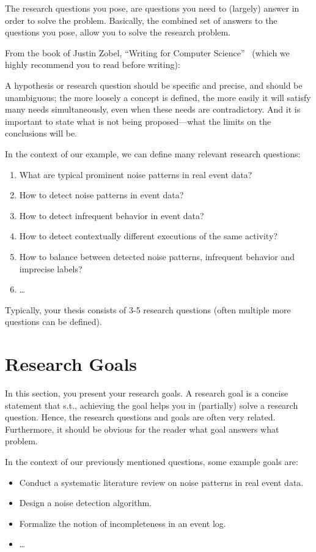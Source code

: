 {The research questions you pose, are questions you need to (largely) answer in order to solve the problem.
Basically, the combined set of answers to the questions you pose, allow you to solve the research problem.

From the book of Justin Zobel, \enquote{Writing for Computer Science}~\autocite{DBLP:books/sp/Zobel14} (which we highly recommend you to read before writing):

\begin{displayquote}
	A hypothesis or research question should be specific and precise, and should be
	unambiguous; the more loosely a concept is defined, the more easily it will satisfy
	many needs simultaneously, even when these needs are contradictory. And it is
	important to state what is not being proposed—what the limits on the conclusions
	will be.
\end{displayquote}

In the context of our example, we can define many relevant research questions:
\begin{enumerate}
	\item What are typical prominent noise patterns in real event data?
	\item How to detect noise patterns in event data?
	\item How to detect infrequent behavior in event data?
	\item How to detect contextually different executions of the same activity?
	\item How to balance between detected noise patterns, infrequent behavior and imprecise labels?
	\item \dots
\end{enumerate}
Typically, your thesis consists of 3-5 research questions (often multiple more questions can be defined).

\section{Research Goals}

In this section, you present your research goals.
A research goal is a concise statement that s.t., achieving the goal helps you in (partially) solve a research question.
Hence, the research questions and goals are often very related.
Furthermore, it should be obvious for the reader what goal answers what problem.

In the context of our previously mentioned questions, some example goals are:
\begin{itemize}
	\item Conduct a systematic literature review on noise patterns in real event data.
	\item Design a noise detection algorithm.
	\item Formalize the notion of incompleteness in an event log.
	\item \dots
\end{itemize}

}
